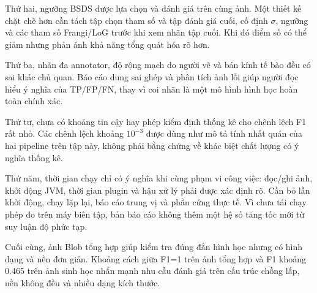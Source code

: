 Thứ hai, ngưỡng BSDS được lựa chọn và đánh giá trên cùng ảnh. Một thiết kế chặt chẽ hơn cần tách tập chọn tham số và tập đánh giá cuối, cố định $\sigma$, ngưỡng và các tham số Frangi/LoG trước khi xem nhãn tập cuối. Khi đó điểm số có thể giảm nhưng phản ánh khả năng tổng quát hóa rõ hơn.

Thứ ba, nhãn đa annotator, độ rộng mạch do người vẽ và bán kính tế bào đều có sai khác chủ quan. Báo cáo dung sai ghép và phân tích ảnh lỗi giúp người đọc hiểu ý nghĩa của TP/FP/FN, thay vì coi nhãn là một mô hình hình học hoàn toàn chính xác.

Thứ tư, chưa có khoảng tin cậy hay phép kiểm định thống kê cho chênh lệch F1 rất nhỏ. Các chênh lệch khoảng $10^{-3}$ được dùng như mô tả tính nhất quán của hai pipeline trên tập này, không phải bằng chứng về khác biệt chất lượng có ý nghĩa thống kê.

Thứ năm, thời gian chạy chỉ có ý nghĩa khi cùng phạm vi công việc: đọc/ghi ảnh, khởi động JVM, thời gian plugin và hậu xử lý phải được xác định rõ. Cần bỏ lần khởi động, chạy lặp lại, báo cáo trung vị và phần cứng thực tế. Vì chưa tái chạy phép đo trên máy biên tập, bản báo cáo không thêm một hệ số tăng tốc mới từ suy luận độ phức tạp.

Cuối cùng, ảnh Blob tổng hợp giúp kiểm tra đúng đắn hình học nhưng có hình dạng và nền đơn giản. Khoảng cách giữa F1=1 trên ảnh tổng hợp và F1 khoảng 0.465 trên ảnh sinh học nhấn mạnh nhu cầu đánh giá trên cấu trúc chồng lấp, nền không đều và nhiều dạng kích thước.
